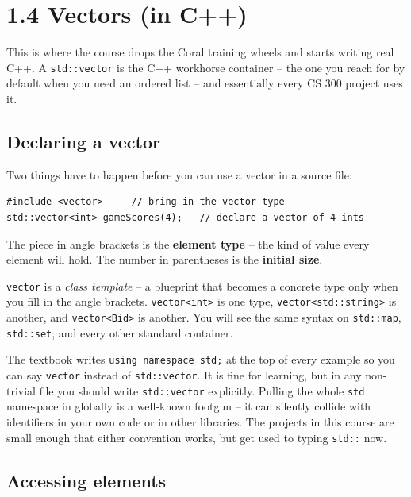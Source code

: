 \documentclass[11pt]{article}
\begin{document}
\section{1.4 Vectors (in C++)}

This is where the course drops the Coral training wheels and starts
writing real C++. A \texttt{std::vector} is the C++ workhorse container
-- the one you reach for by default when you need an ordered list --
and essentially every CS 300 project uses it.

\subsection{Declaring a vector}

Two things have to happen before you can use a vector in a source file:
\begin{lstlisting}
#include <vector>     // bring in the vector type
std::vector<int> gameScores(4);   // declare a vector of 4 ints
\end{lstlisting}

The piece in angle brackets is the \textbf{element type} -- the kind of
value every element will hold. The number in parentheses is the
\textbf{initial size}.

\begin{defnbox}
\texttt{vector} is a \emph{class template} -- a blueprint that becomes
a concrete type only when you fill in the angle brackets.
\texttt{vector<int>} is one type, \texttt{vector<std::string>} is
another, and \texttt{vector<Bid>} is another. You will see the same
syntax on \texttt{std::map}, \texttt{std::set}, and every other
standard container.
\end{defnbox}

\begin{notebox}
The textbook writes \texttt{using namespace std;} at the top of every
example so you can say \texttt{vector} instead of \texttt{std::vector}.
It is fine for learning, but in any non-trivial file you should write
\texttt{std::vector} explicitly. Pulling the whole \texttt{std}
namespace in globally is a well-known footgun -- it can silently
collide with identifiers in your own code or in other libraries. The
projects in this course are small enough that either convention works,
but get used to typing \texttt{std::} now.
\end{notebox}

\subsection{Accessing elements}
\end{document}

